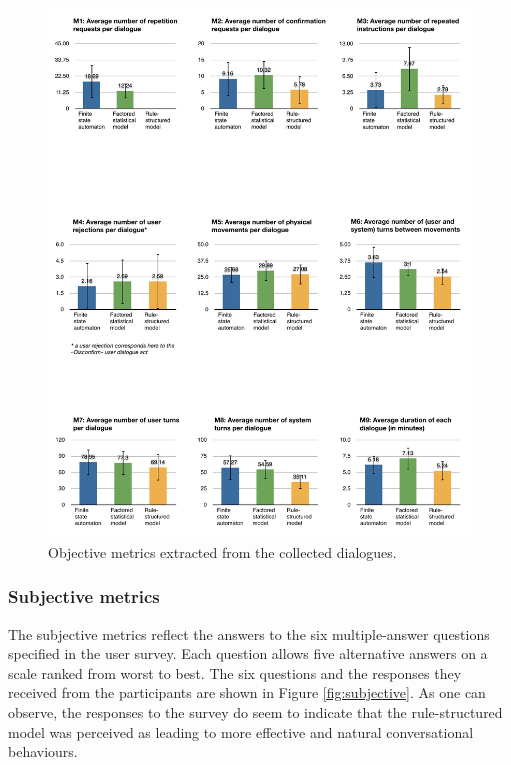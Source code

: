 \begin{figure}[p]
\begin{center}
\includegraphics[scale=0.5]{imgs/objective.pdf}
\end{center} 
\caption{Objective metrics extracted from the collected dialogues. }
\label{fig:objective}
\end{figure}


\subsubsection*{Subjective metrics}

The subjective metrics reflect the answers to the six multiple-answer questions specified in the user survey. Each question allows five alternative answers on a scale ranked from worst to best.  The six questions and the responses they received from the participants are shown in Figure \ref{fig:subjective}. As one can observe, the responses to the survey do seem to indicate that the rule-structured model was perceived as leading to more effective and natural conversational behaviours. 


